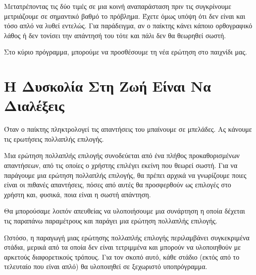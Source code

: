 \documentclass[a4paper,11pt,oneside]{book}
\begin{document}
Μετατρέποντας τις δύο τιμές σε μια κοινή αναπαράσταση πριν τις συγκρίνουμε μετριάζουμε σε σημαντικό βαθμό το πρόβλημα. Έχετε όμως υπόψη ότι δεν είναι και τόσο απλό να λυθεί εντελώς. Για παράδειγμα, αν ο παίκτης κάνει κάποιο ορθογραφικό λάθος ή δεν τονίσει την απάντησή του τότε και πάλι δεν θα θεωρηθεί σωστή.

Στο κύριο πρόγραμμα, μπορούμε να προσθέσουμε τη νέα ερώτηση στο παιχνίδι μας.


\section{Η Δυσκολία Στη Ζωή Είναι Να Διαλέξεις}

\begin{question}
Όταν ο παίκτης πληκτρολογεί τις απαντήσεις του μπαίνουμε σε μπελάδες. Ας κάνουμε τις ερωτήσεις πολλαπλής επιλογής.
\end{question}

Μια ερώτηση πολλαπλής επιλογής συνοδεύεται από ένα πλήθος προκαθορισμένων απαντήσεων, από τις οποίες ο χρήστης επιλέγει εκείνη που θεωρεί σωστή. Για να παράγουμε μια ερώτηση πολλαπλής επιλογής, θα πρέπει αρχικά να γνωρίζουμε ποιες είναι οι πιθανές απαντήσεις, πόσες από αυτές θα προσφερθούν ως επιλογές στο χρήστη και, φυσικά, ποια είναι η σωστή απάντηση.

Θα μπορούσαμε λοιπόν απευθείας να υλοποιήσουμε μια συνάρτηση η οποία δέχεται τις παραπάνω παραμέτρους και παράγει μια ερώτηση πολλαπλής επιλογής.


Ωστόσο, η παραγωγή μιας ερώτησης πολλαπλής επιλογής περιλαμβάνει συγκεκριμένα στάδια, μερικά από τα οποία δεν είναι τετριμμένα και μπορούν να υλοποιηθούν με αρκετούς διαφορετικούς τρόπους. Για τον σκοπό αυτό, κάθε στάδιο (εκτός από το τελευταίο που είναι απλό) θα υλοποιηθεί σε ξεχωριστό υποπρόγραμμα. 

\end{document}
